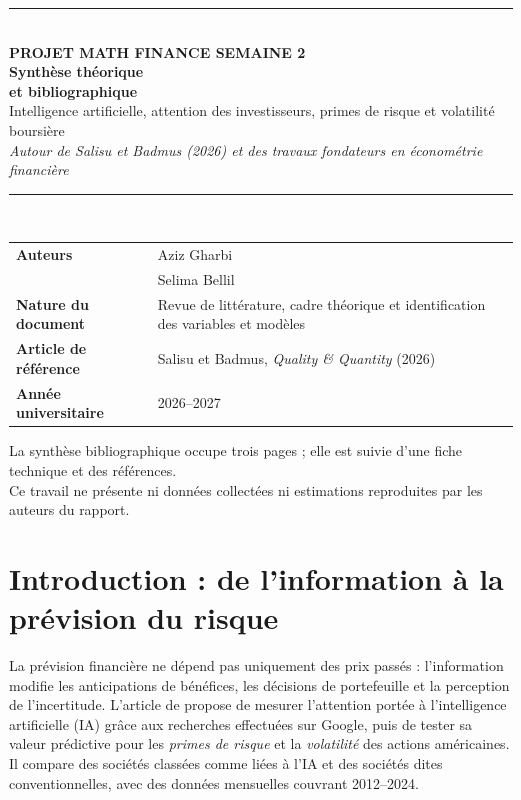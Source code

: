 \documentclass[11pt,a4paper]{article}
\begin{document}
\begin{titlepage}
\thispagestyle{empty}
\vspace*{2.2cm}
{\color{teal}\rule{\textwidth}{1.8pt}}\\[0.6cm]
{\large\bfseries\color{teal}PROJET MATH FINANCE \quad\textbar\quad SEMAINE 2}\\[1.0cm]
{\Huge\bfseries\color{navy}Synthèse théorique\\[0.17cm] et bibliographique}\\[0.72cm]
{\LARGE\color{navy}Intelligence artificielle, attention des investisseurs, primes de risque et volatilité boursière}\\[0.85cm]
{\large\itshape Autour de Salisu et Badmus (2026) et des travaux fondateurs en économétrie financière}\\[0.85cm]
{\color{teal}\rule{\textwidth}{1pt}}\\[0.85cm]
\begin{tabularx}{\textwidth}{@{}>{\bfseries}p{4.25cm}X@{}}
Auteurs & Aziz Gharbi\\[0.07cm]
 & Selima Bellil\\[0.26cm]
Nature du document & Revue de littérature, cadre théorique et identification des variables et modèles\\[0.15cm]
Article de référence & Salisu et Badmus, \textit{Quality \& Quantity} (2026)\\[0.15cm]
Année universitaire & 2026--2027\\
\end{tabularx}
\vfill
{\small\color{muted}La synthèse bibliographique occupe trois pages ; elle est suivie d'une fiche technique et des références.\\
Ce travail ne présente ni données collectées ni estimations reproduites par les auteurs du rapport.}
\end{titlepage}

\section{Introduction : de l'information à la prévision du risque}
La prévision financière ne dépend pas uniquement des prix passés : l'information modifie les anticipations de bénéfices, les décisions de portefeuille et la perception de l'incertitude. L'article de \cite{SalisuBadmus2026} propose de mesurer l'attention portée à l'intelligence artificielle (IA) grâce aux recherches effectuées sur Google, puis de tester sa valeur prédictive pour les \emph{primes de risque} et la \emph{volatilité} des actions américaines. Il compare des sociétés classées comme liées à l'IA et des sociétés dites conventionnelles, avec des données mensuelles couvrant 2012--2024.
\end{document}
